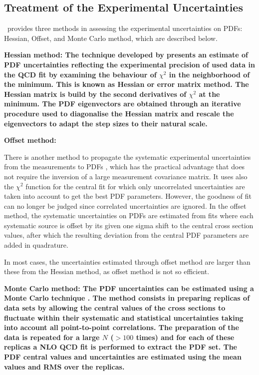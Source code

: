 \subsection{Treatment of the Experimental Uncertainties}

\fitter\ provides three methods in assessing the experimental uncertainties on PDFs: Hessian, Offset, and Monte Carlo method, which are described below.
\begin{description}
\item \bf{Hessian method:} \rm
The technique developed by \cite{Pumplin:2001ct} presents an estimate of PDF uncertainties reflecting the experimental precision of used data in the QCD fit by examining the behaviour of $\chi^2$ in the neighborhood of the minimum. This is known as Hessian or error matrix method. The Hessian matrix is build by the second derivatives of $\chi^2$ at the minimum. The PDF eigenvectors are obtained through an iterative procedure used to diagonalise the Hessian matrix and rescale the eigenvectors to adapt the step sizes to their natural scale.

\item \bf{Offset  method:} \rm

There is another method to propagate the systematic experimental uncertainties from the measurements to PDFs \cite{Botje:2001fx}, which has the practical advantage that does not require the inversion of a large measurement covariance matrix.
%
It uses also the $\chi^2$ function for the central fit for which only
uncorrelated uncertainties are taken into account to get the best PDF parameters.
%
However, the goodness of fit can no longer be judged since correlated uncertainties are ignored. 
%
In the offset method, the systematic uncertainties on PDFs are estimated from fits where each systematic source is offset by its given one sigma shift to the central cross section values, after which the 
resulting deviation from the central PDF parameters are added in quadrature. 

In most cases, the uncertainties estimated through offset method are larger than these from the Hessian method, as offset method is not so efficient.

\item \bf{Monte Carlo method:} \rm
The PDF uncertainties can be estimated using a Monte Carlo technique \cite{Giele:1998gw, mcmethod2}.
The method consists in preparing replicas of data sets by allowing the central values of the cross sections to 
fluctuate within their systematic and statistical uncertainties taking into account all point-to-point correlations.
The preparation of the data is repeated for a large $N$ ($>100$ times) and for each of these replicas a NLO QCD fit is performed to 
extract the PDF set. The PDF central values and uncertainties are estimated using the mean values and RMS 
over the replicas. 
\end{description}



